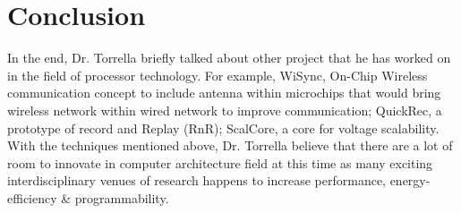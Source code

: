 \documentclass[twoside]{article}
\begin{document}
\section{Conclusion}
In the end, Dr. Torrella briefly talked about other project that he has worked on in the field of processor technology. For example, WiSync, On-Chip Wireless communication concept to include antenna within microchips that would bring wireless network within wired network to improve communication; QuickRec, a prototype of record and Replay (RnR); ScalCore, a core for voltage scalability. With the techniques mentioned above, Dr. Torrella believe that there are a lot of room to innovate in computer architecture field at this time as many exciting interdisciplinary venues of research happens to increase performance, energy-efficiency \& programmability.
\end{document}
